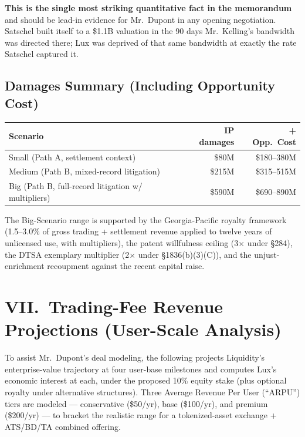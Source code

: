 \documentclass[11pt,letterpaper]{article}
\begin{document}
\textbf{This is the single most striking quantitative fact in the
memorandum} and should be lead-in evidence for Mr.\ Dupont in any
opening negotiation. Satschel built itself to a \$1.1B valuation in
the 90 days Mr.\ Kelling's bandwidth was directed there; Lux was
deprived of that same bandwidth at exactly the rate Satschel
captured it.

\subsection*{Damages Summary (Including Opportunity Cost)}

\begin{center}
\begin{tabular}{lrr}
\toprule
\textbf{Scenario} & \textbf{IP damages} & \textbf{+ Opp.\ Cost} \\
\midrule
Small (Path A, settlement context) & \$80M & \$180--380M \\
Medium (Path B, mixed-record litigation) & \$215M & \$315--515M \\
Big (Path B, full-record litigation w/ multipliers) & \$590M & \$690--890M \\
\bottomrule
\end{tabular}
\end{center}

The Big-Scenario range is supported by the Georgia-Pacific royalty
framework (1.5--3.0\% of gross trading + settlement revenue applied
to twelve years of unlicensed use, with multipliers), the patent
willfulness ceiling (3$\times$ under \S 284), the DTSA exemplary
multiplier (2$\times$ under \S 1836(b)(3)(C)), and the unjust-
enrichment recoupment against the recent capital raise.

\section*{VII.\ Trading-Fee Revenue Projections (User-Scale Analysis)}

To assist Mr.\ Dupont's deal modeling, the following projects
Liquidity's enterprise-value trajectory at four user-base milestones
and computes Lux's economic interest at each, under the proposed
10\% equity stake (plus optional royalty under alternative
structures). Three Average Revenue Per User (``ARPU'') tiers are
modeled --- conservative (\$50/yr), base (\$100/yr), and premium
(\$200/yr) --- to bracket the realistic range for a tokenized-asset
exchange + ATS/BD/TA combined offering.
\end{document}
